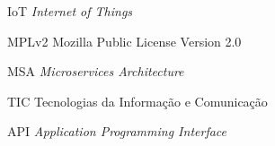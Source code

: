 \begin{siglas}
    \item [IoT] \textit{Internet of Things}
    \item [MPLv2] Mozilla Public License Version 2.0
    \item [MSA] \textit{Microservices Architecture}
    \item [TIC] Tecnologias da Informação e Comunicação
    \item [API] \textit{Application Programming Interface}
\end{siglas}
